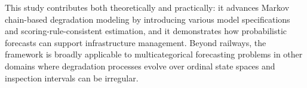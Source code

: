 This study contributes both theoretically and practically: it advances Markov chain-based degradation modeling by introducing various model specifications and scoring-rule-consistent estimation, and it demonstrates how probabilistic forecasts can support infrastructure management. Beyond railways, the framework is broadly applicable to multicategorical forecasting problems in other domains where degradation processes evolve over ordinal state spaces and inspection intervals can be irregular.

